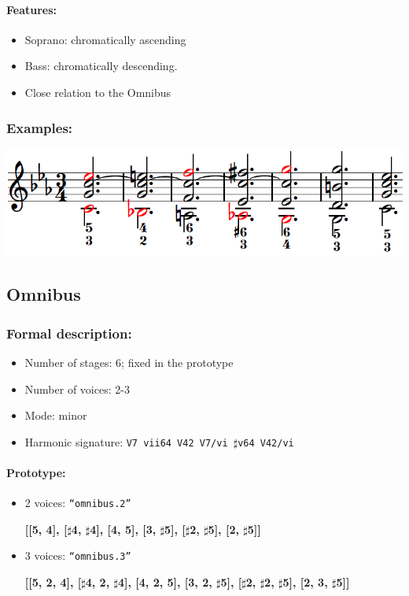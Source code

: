 ﻿\documentclass[11pt, openany]{article}
\begin{document}
\begin{itemize}
\paragraph{Features:}
\begin{itemize}
\item Soprano: chromatically ascending
\item Bass: chromatically descending.
\item Close relation to the Omnibus
\end{itemize}

\subsubsection{Examples:}
\begin{center}
\includegraphics[scale=0.8]{morte.png}
\end{center}


	\subsection{Omnibus}
	
\subsubsection{Formal description:}
\begin{itemize}
\item Number of stages: 6; fixed in the prototype
\item Number of voices: 2-3
\item Mode: minor
\item Harmonic signature: \texttt{V7 vii64 V42 V7/vi $\sharp$v64 V42/vi}
\end{itemize}

\paragraph{Prototype:}
\begin{itemize}
\item 2 voices: \texttt{“omnibus.2”}
	\begin{center}
	\textbf{[[5, 4], [$\sharp$4, $\sharp$4], [4, 5], [3, $\sharp$5], [$\sharp$2, $\sharp$5], [2, $\sharp$5]]}
	\end{center}
\item 3 voices: \texttt{“omnibus.3”}
	\begin{center}
	\textbf{[[5, 2, 4], [$\sharp$4, 2, $\sharp$4], [4, 2, 5], [3, 2, $\sharp$5], [$\sharp$2, $\sharp$2, $\sharp$5], [2, 3, $\sharp$5]]}
	\end{center}
\end{itemize}


\end{itemize}
\end{document}
